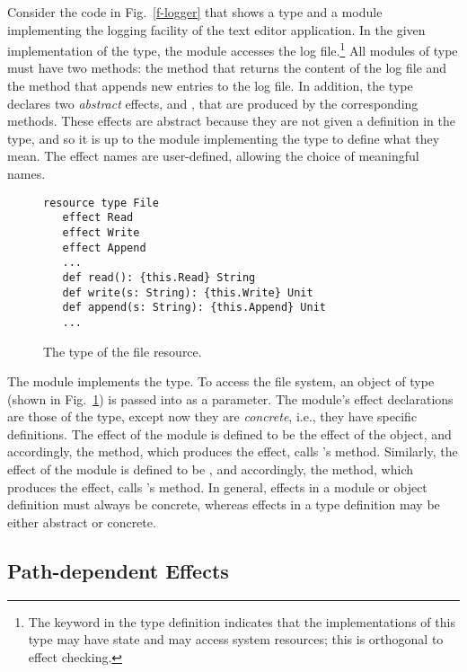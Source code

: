 Consider the code in Fig.~\ref{f-logger} that shows a type and a module implementing the logging facility of the text editor application.  In the given implementation of the  type, the  module accesses the log file.\footnote{The keyword  in the type definition indicates that the implementations of this type may have state and may access system resources; this is orthogonal to effect checking.} All modules of type  must have two methods: the  method that returns the content of the log file and the  method that appends new entries to the log file. In addition, the  type declares two \textit{abstract} effects,  and , that are produced by the corresponding methods. These effects are abstract because they are not given a definition in the  type, and so it is up to the module implementing the  type to define what they mean. The effect names are user-defined, allowing the choice of meaningful names.

\begin{figure}[t]
\begin{lstlisting}
resource type File
   effect Read
   effect Write
   effect Append
   ...
   def read(): {this.Read} String
   def write(s: String): {this.Write} Unit
   def append(s: String): {this.Append} Unit
   ...
\end{lstlisting}
\caption{The type of the file resource.}
\label{f-file}
\end{figure}

The  module implements the  type. To access the file system, an object of type  (shown in Fig.~\ref{f-file}) is passed into  as a parameter. The  module's effect declarations are those of the  type, except now they are \textit{concrete}, i.e., they have specific definitions. The  effect of the  module is defined to be the  effect of the  object, and accordingly, the  method, which produces the  effect, calls 's  method. Similarly, the  effect of the  module is defined to be , and accordingly, the  method, which produces the  effect, calls 's  method. In general, effects in a module or object definition must always be concrete, whereas effects in a type definition may be either abstract or concrete.


\subsection{Path-dependent Effects}

